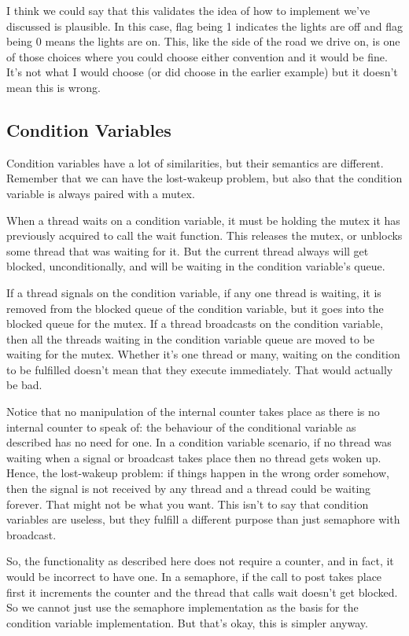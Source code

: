 I think we could say that this validates the idea of how to implement we've discussed is plausible. In this case, flag being 1 indicates the lights are off and flag being 0 means the lights are on. This, like the side of the road we drive on, is one of those choices where you could choose either convention and it would be fine. It's not what I would choose (or did choose in the earlier example) but it doesn't mean this is wrong.

\subsection*{Condition Variables}
Condition variables have a lot of similarities, but their semantics are different. Remember that we can have the lost-wakeup problem, but also that the condition variable is always paired with a mutex.

When a thread waits on a condition variable, it must be holding the mutex it has previously acquired to call the wait function. This releases the mutex, or unblocks some thread that was waiting for it. But the current thread always will get blocked, unconditionally, and will be waiting in the condition variable's queue.

If a thread signals on the condition variable, if any one thread is waiting, it is removed from the blocked queue of the condition variable, but it goes into the blocked queue for the mutex. If a thread broadcasts on the condition variable, then all the threads waiting in the condition variable queue are moved to be waiting for the mutex. Whether it's one thread or many, waiting on the condition to be fulfilled doesn't mean that they execute immediately. That would actually be bad.

Notice that no manipulation of the internal counter takes place as there is no internal counter to speak of: the behaviour of the conditional variable as described has no need for one. In a condition variable scenario, if no thread was waiting when a signal or broadcast takes place then no thread gets woken up. Hence, the lost-wakeup problem: if things happen in the wrong order somehow, then the signal is not received by any thread and a thread could be waiting forever. That might not be what you want. This isn't to say that condition variables are useless, but they fulfill a different purpose than just semaphore with broadcast.

So, the functionality as described here does not require a counter, and in fact, it would be incorrect to have one. In a semaphore, if the call to post takes place first it increments the counter and the thread that calls wait doesn't get blocked. So we cannot just use the semaphore implementation as the basis for the condition variable implementation. But that's okay, this is simpler anyway.





